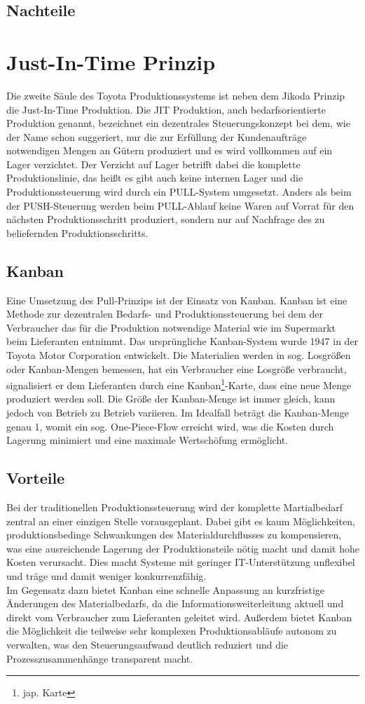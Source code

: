 \documentclass[00_ToyotaProduktionssystem.tex]{subfiles}
\begin{document}
\subsection{Nachteile}

\section{Just-In-Time Prinzip}
Die zweite Säule des Toyota Produktionssystems ist neben dem Jikoda Prinzip die Just-In-Time Produktion. Die JIT Produktion, auch bedarfsorientierte Produktion genannt, bezeichnet ein dezentrales Steuerungskonzept bei dem,  wie der Name schon suggeriert, nur die zur Erfüllung der Kundenaufträge notwendigen Mengen an Gütern produziert und es wird vollkommen auf ein Lager verzichtet. Der Verzicht auf Lager betrifft dabei die komplette Produktionslinie, das heißt es gibt auch keine internen Lager und die Produktionssteuerung wird durch ein PULL-System umgesetzt. Anders als beim der PUSH-Steuerung werden beim PULL-Ablauf keine Waren auf Vorrat für den nächsten Produktionsschritt produziert, sondern nur auf Nachfrage des zu beliefernden Produktionsschritts.

\subsection{Kanban}
Eine Umsetzung des Pull-Prinzips ist der Einsatz von Kanban. Kanban ist eine Methode zur dezentralen Bedarfs- und Produktionssteuerung bei dem der Verbraucher das für die Produktion notwendige Material wie im Supermarkt beim Lieferanten entnimmt. Das ursprüngliche Kanban-System wurde 1947 in der Toyota Motor Corporation entwickelt. Die Materialien werden in sog. Losgrößen oder Kanban-Mengen bemessen, hat ein Verbraucher eine Losgröße verbraucht, signalisiert er dem Lieferanten durch eine Kanban\footnote{jap. Karte}-Karte, dass eine neue Menge produziert werden soll. Die Größe der Kanban-Menge ist immer gleich, kann jedoch von Betrieb zu Betrieb variieren. Im Idealfall beträgt die Kanban-Menge genau 1, womit ein sog. One-Piece-Flow erreicht wird, was die Kosten durch Lagerung minimiert und eine maximale Wertschöfung ermöglicht.

\subsection{Vorteile}
Bei der traditionellen Produktionssteuerung wird der komplette Martialbedarf zentral an einer einzigen Stelle vorausgeplant. Dabei gibt es kaum Möglichkeiten, produktionsbedinge Schwankungen des Materialdurchflusses zu kompensieren, was eine ausreichende Lagerung der Produktionsteile nötig macht und damit hohe Kosten verursacht. Dies macht Systeme mit geringer IT-Unterstützung unflexibel und träge und damit weniger konkurrenzfähig.\\
Im Gegensatz dazu bietet Kanban eine schnelle Anpassung an kurzfristige Änderungen des Materialbedarfs, da die Informationsweiterleitung aktuell und direkt vom Verbraucher zum Lieferanten geleitet wird. Außerdem bietet Kanban die Möglichkeit die teilweise sehr komplexen Produktionsabläufe autonom zu verwalten, was den Steuerungsaufwand deutlich reduziert und die Prozesszusammenhänge transparent macht.
\end{document}

